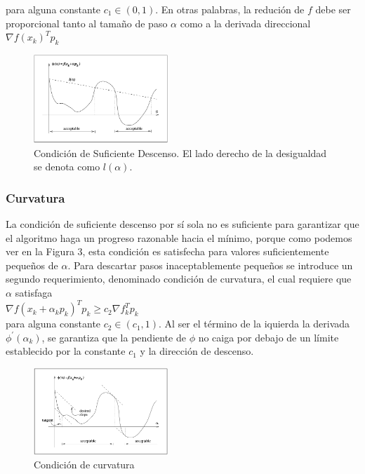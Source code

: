 \documentclass[10pt,journal,compsoc]{styles/IEEEtran}
\begin{document}
para alguna constante $c_1 \in (0,1)$. En otras palabras, la reduci\'on de $f$ debe ser proporcional tanto al tama\~no de paso $\alpha$ como a la derivada direccional $\nabla f(x_k)^T p_k$

\begin{figure}[hbtp]
\centering
\includegraphics[width=0.45\textwidth]{sufdec.png}
\caption{Condici\'on de Suficiente Descenso. El lado derecho de la desigualdad se denota como $l(\alpha)$. }
\end{figure}

\subsubsection{Curvatura}

La condici\'on de suficiente descenso por s\'i sola no es suficiente para garantizar que el algoritmo haga un progreso razonable hacia el m\'inimo, porque como podemos ver en la Figura 3, esta condici\'on es satisfecha para valores suficientemente peque\~nos de $\alpha$. Para descartar pasos inaceptablemente peque\~nos se introduce un segundo requerimiento, denominado condici\'on de curvatura, el cual requiere que $\alpha$ satisfaga\\

$\nabla f(x_k+\alpha_k p_k)^Tp_k \geq c_2 \nabla f_k^T p_k$\\

para alguna constante $c_2 \in (c_1,1)$. Al ser el t\'ermino de la iquierda la derivada $\phi^{'} (\alpha_k)$, se garantiza que la pendiente  de $\phi$ no caiga por debajo de un l\'imite establecido por la constante $c_1$ y la direcci\'on de descenso.

\begin{figure}[hbtp]
\centering
\includegraphics[width=0.45\textwidth]{curvature.png}
\caption{Condici\'on de curvatura }
\end{figure}
\end{document}
